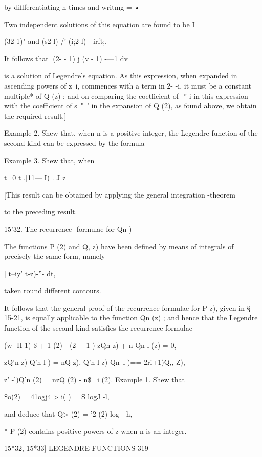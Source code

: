 {{by diflferentiating n times and writmg   =   • 

Two independent solutions of this equation are found to be I 

(32-1)" and (s2-l) /' (i;2-l)- -irft;. 

It follows that   |(2-  - 1)  j  (v - 1) -—1 dv  

is a solution of Legendre's equation. As this expression, when expanded in ascending 
powers of z~i, commences with a term in 2- -i, it must be a constant multiple* of Q  (z) ; 
and on comparing the coetficient of  -''-i in this expression with the coefficient of s~"~' in 
the expansion of Q  (2), as found above, we obtain the required result.] 

Example 2. Shew that, when n is a positive integer, the Legendre function of the 
second kind can be expressed by the formula 

Example 3. Shew that, when %

t=0 t .[11— I) . J z 

[This result can be obtained by applying the general integration -theorem 

to the preceding result.] 

15'32. The recurrence- formulae for Qn  )- 

The functions P  (2) and Q,   z) have been defined by means of integrals of precisely the 
same form, namely 

[ t--iy' t-z)-''- dt, 

taken round different contours. 

It follows that the general proof of the recurrence-formulae for P  z), given in § 15-21, 
is equally applicable to the function Qn (z) ; and hence that the Legendre function of the 
second kind satisfies the recurrence-formulae 

(w -H 1) \$  + 1 (2) - (2  + 1 ) zQn  z) + n Qn-l (z) = 0, 

zQ'n z)-Q'n-l  ) = nQ  z), 
Q'n l z)-Qn~l  )== 2ri+1)Q,, Z), 

 z' -l)Q'n (2) = nzQ  (2) - n\$ \ i (2). 
Example 1. Shew that 

\$o(2) = 41ogj4|>  i( ) = S logJ -l, 

and deduce that Q> (2) =  '2 (2) log   - h, 

* P  (2) contains positive powers of z when n is an integer. 



15*32, 15*33] LEGENDRE FUNCTIONS 319 

}}

